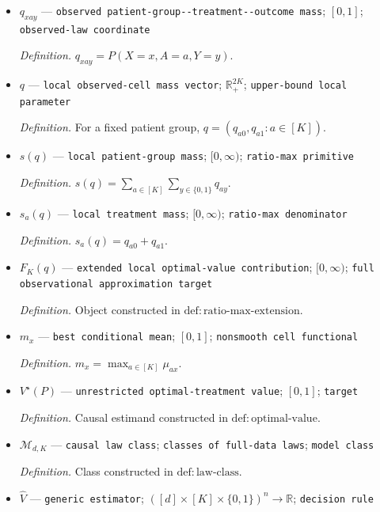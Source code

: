 \documentclass{article}
\begin{document}
\begin{itemize}
  \item \(q_{xay}\) --- \texttt{observed patient-\allowbreak{}group-\allowbreak{}-\allowbreak{}treatment-\allowbreak{}-\allowbreak{}outcome mass}; \([0,1]\); \texttt{observed-\allowbreak{}law coordinate}
  \par\smallskip\noindent\emph{Definition.} \(q_{xay}=P(X=x,A=a,Y=y)\).
  \item \(q\) --- \texttt{local observed-\allowbreak{}cell mass vector}; \(\mathbb R_+^{2K}\); \texttt{upper-\allowbreak{}bound local parameter}
  \par\smallskip\noindent\emph{Definition.} For a fixed patient group, \(q=(q_{a0},q_{a1}:a\in[K])\).
  \item \(s(q)\) --- \texttt{local patient-\allowbreak{}group mass}; \([0,\infty)\); \texttt{ratio-\allowbreak{}max primitive}
  \par\smallskip\noindent\emph{Definition.} \(s(q)=\sum_{a\in[K]}\sum_{y\in\{0,1\}}q_{ay}\).
  \item \(s_a(q)\) --- \texttt{local treatment mass}; \([0,\infty)\); \texttt{ratio-\allowbreak{}max denominator}
  \par\smallskip\noindent\emph{Definition.} \(s_a(q)=q_{a0}+q_{a1}\).
  \item \(F_K(q)\) --- \texttt{extended local optimal-\allowbreak{}value contribution}; \([0,\infty)\); \texttt{full observational approximation target}
  \par\smallskip\noindent\emph{Definition.} Object constructed in \(\mathrm{def{:}ratio\text{-}max\text{-}extension}\).
  \item \(m_x\) --- \texttt{best conditional mean}; \([0,1]\); \texttt{nonsmooth cell functional}
  \par\smallskip\noindent\emph{Definition.} \(m_x=\max_{a\in[K]}\mu_{ax}\).
  \item \(V^\star(P)\) --- \texttt{unrestricted optimal-\allowbreak{}treatment value}; \([0,1]\); \texttt{target}
  \par\smallskip\noindent\emph{Definition.} Causal estimand constructed in \(\mathrm{def{:}optimal\text{-}value}\).
  \item \(\mathcal M_{d,K}\) --- \texttt{causal law class}; \texttt{classes of full-\allowbreak{}data laws}; \texttt{model class}
  \par\smallskip\noindent\emph{Definition.} Class constructed in \(\mathrm{def{:}law\text{-}class}\).
  \item \(\widehat V\) --- \texttt{generic estimator}; \(([d]\times[K]\times\{0,1\})^n\to\mathbb R\); \texttt{decision rule}

\end{itemize}
\end{document}
